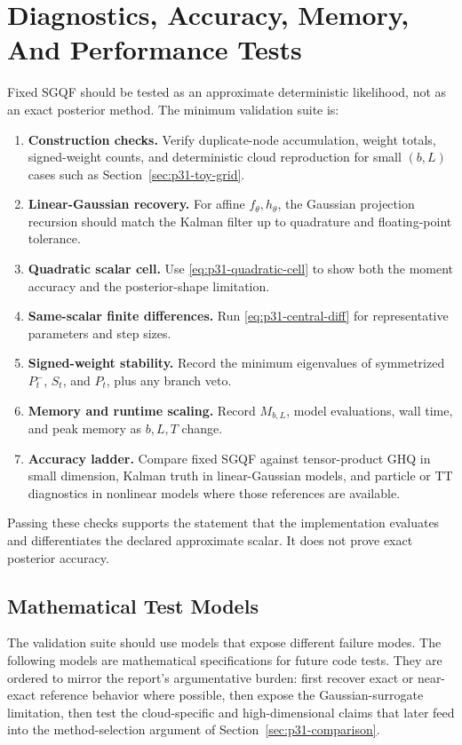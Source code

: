 \documentclass[11pt]{article}
\numberwithin{equation}{section}
\begin{document}
\section{Diagnostics, Accuracy, Memory, And Performance Tests}
\label{sec:p31-validation}

Fixed SGQF should be tested as an approximate deterministic likelihood, not as
an exact posterior method.  The minimum validation suite is:

\begin{enumerate}[leftmargin=0.24in]
\item \textbf{Construction checks.}  Verify duplicate-node accumulation,
weight totals, signed-weight counts, and deterministic cloud reproduction for
small \((b,L)\) cases such as Section~\ref{sec:p31-toy-grid}.
\item \textbf{Linear-Gaussian recovery.}  For affine \(f_\theta,h_\theta\),
the Gaussian projection recursion should match the Kalman filter up to
quadrature and floating-point tolerance.
\item \textbf{Quadratic scalar cell.}  Use \eqref{eq:p31-quadratic-cell} to
show both the moment accuracy and the posterior-shape limitation.
\item \textbf{Same-scalar finite differences.}  Run
\eqref{eq:p31-central-diff} for representative parameters and step sizes.
\item \textbf{Signed-weight stability.}  Record the minimum eigenvalues of
symmetrized \(P_t^-\), \(S_t\), and \(P_t\), plus any branch veto.
\item \textbf{Memory and runtime scaling.}  Record \(M_{b,L}\), model
evaluations, wall time, and peak memory as \(b,L,T\) change.
\item \textbf{Accuracy ladder.}  Compare fixed SGQF against tensor-product GHQ
in small dimension, Kalman truth in linear-Gaussian models, and particle or TT
diagnostics in nonlinear models where those references are available.
\end{enumerate}

Passing these checks supports the statement that the implementation evaluates
and differentiates the declared approximate scalar.  It does not prove exact
posterior accuracy.

\subsection{Mathematical Test Models}
\label{subsec:p32-test-models}

The validation suite should use models that expose different failure modes.
The following models are mathematical specifications for future code tests.  They
are ordered to mirror the report's argumentative burden: first recover exact or
near-exact reference behavior where possible, then expose the Gaussian-surrogate
limitation, then test the cloud-specific and high-dimensional claims that later
feed into the method-selection argument of Section~\ref{sec:p31-comparison}.
\end{document}
